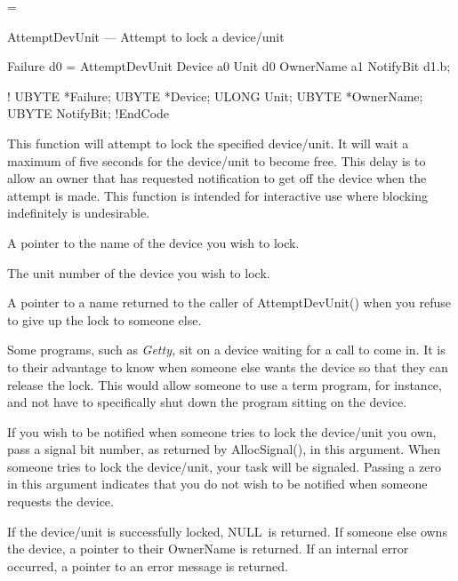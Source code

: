 \magnification=\magstephalf



\def\ODU{OwnDevUnit.li\-brary}
\def\NULL{{\TT NULL}}


\Header{\ODU}{AttemptDevUnit}
AttemptDevUnit --- Attempt to lock a device/unit

\Synopsis Failure d0 = AttemptDevUnit Device a0 Unit d0 OwnerName a1
NotifyBit d1.b;

\BeginCode!
UBYTE   *Failure;
UBYTE   *Device;
ULONG    Unit;
UBYTE   *OwnerName;
UBYTE    NotifyBit;
!EndCode

This function will attempt to lock the specified device/unit.  It will wait
a maximum of five seconds for the device/unit to become free.  This delay
is to allow an owner that has requested notification to get off the device
when the attempt is made.  This function is intended for interactive use
where blocking indefinitely is undesirable.

A pointer to the name of the device you wish to lock.
\EndSub

The unit number of the device you wish to lock.
\EndSub

A pointer to a name returned to the caller of {\TT AttemptDevUnit()} when
you refuse to give up the lock to someone else.
\EndSub

Some programs, such as {\sl Getty,} sit on a device waiting for a call to
come in.  It is to their advantage to know when someone else wants the device
so that they can release the lock.  This would allow someone to use a term
program, for instance, and not have to specifically shut down the program
sitting on the device.

If you wish to be notified when someone tries to lock the device/unit you
own, pass a signal bit number, as returned by {\TT AllocSignal()}, in this
argument.  When someone tries to lock the device/unit, your task will be
signaled.  Passing a zero in this argument indicates that you do not wish
to be notified when someone requests the device.
\EndSub

If the device/unit is successfully locked, \NULL\ is returned.  If someone
else owns the device, a pointer to their {\TT OwnerName} is returned.  If
an internal error occurred, a pointer to an error message is returned.

